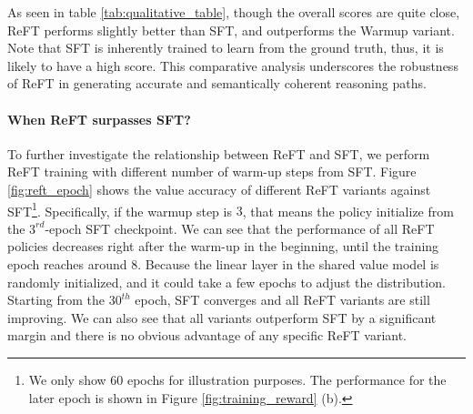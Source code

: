 \begin{table}[t!]
    \centering
    \caption{Qualitative scores of models from three methods trained on GSM8k P-CoT dataset.}
    \label{tab:qualitative_table}
\end{table}

As seen in table \ref{tab:qualitative_table}, though the overall scores are quite close, ReFT performs slightly better than SFT, and outperforms the Warmup variant. Note that SFT is inherently trained to learn from the ground truth, thus, it is likely to have a high score.
This comparative analysis underscores the robustness of ReFT in generating accurate and semantically coherent reasoning paths. 

\paragraph{When ReFT surpasses SFT?}
To further investigate the relationship between ReFT and SFT, we perform ReFT training with different number of warm-up steps from SFT. 
Figure \ref{fig:reft_epoch} shows the value accuracy of different ReFT variants against SFT\footnote{We only show 60 epochs for illustration purposes. The performance for the later epoch is shown in Figure \ref{fig:training_reward} (b).}. 
Specifically, if the warmup step is $3$, that means the policy initialize from the $3^{rd}$-epoch SFT checkpoint. 
We can see that the performance of all ReFT policies decreases right after the warm-up in the beginning, until the training epoch reaches around $8$.
Because the linear layer in the shared value model is randomly initialized, and it could take a few epochs to adjust the distribution. 
Starting from the $30^{th}$ epoch, SFT converges and all ReFT variants are still improving. 
We can also see that all variants outperform SFT by a significant margin and there is no obvious advantage of any specific ReFT variant. 

